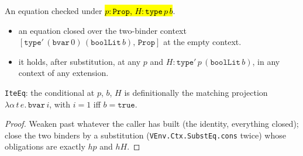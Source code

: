 \begin{theorem}
  \label{prim-cond:thm:reflection-genph}
  \leanok

   An equation checked under \hl{$p : \mathtt{Prop}$, $H : \mathtt{type}\,p\,b$}.
  \begin{itemize}
  \item {} an equation closed over the two-binder context $[\mathtt{type}'\,(\mathtt{bvar}\,0)\,(\mathtt{boolLit}\,b),\,\mathtt{Prop}]$ at the empty context.
  \item {} it holds, after substitution, at any $p$ and $H : \mathtt{type}'\,p\,(\mathtt{boolLit}\,b)$, in any context of any extension.
  \end{itemize}
  \texttt{IteEq}: the conditional at $p$, $b$, $H$ is definitionally the matching projection
  $\lambda \alpha\, t\, e.\,\mathtt{bvar}\,i$, with $i=1$ iff $b = \mathtt{true}$.
\end{theorem}
\begin{proof}
  \leanok
   Weaken past whatever the caller has built (the identity, everything closed); close
  the two binders by a substitution (\texttt{VEnv.Ctx.SubstEq.cons} twice) whose obligations are
  exactly $hp$ and $hH$.
\end{proof}

